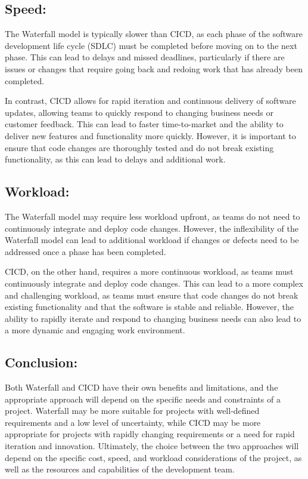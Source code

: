 \documentclass[
  10pt,
  paper=a4,
  ,captions=tableheading
]{scrartcl}
\begin{document}
\hypertarget{speed}{%
\subsection{Speed:}\label{speed}}

The Waterfall model is typically slower than CICD, as each phase of the
software development life cycle (SDLC) must be completed before moving
on to the next phase. This can lead to delays and missed deadlines,
particularly if there are issues or changes that require going back and
redoing work that has already been completed.

In contrast, CICD allows for rapid iteration and continuous delivery of
software updates, allowing teams to quickly respond to changing business
needs or customer feedback. This can lead to faster time-to-market and
the ability to deliver new features and functionality more quickly.
However, it is important to ensure that code changes are thoroughly
tested and do not break existing functionality, as this can lead to
delays and additional work.

\hypertarget{workload}{%
\subsection{Workload:}\label{workload}}

The Waterfall model may require less workload upfront, as teams do not
need to continuously integrate and deploy code changes. However, the
inflexibility of the Waterfall model can lead to additional workload if
changes or defects need to be addressed once a phase has been completed.

CICD, on the other hand, requires a more continuous workload, as teams
must continuously integrate and deploy code changes. This can lead to a
more complex and challenging workload, as teams must ensure that code
changes do not break existing functionality and that the software is
stable and reliable. However, the ability to rapidly iterate and respond
to changing business needs can also lead to a more dynamic and engaging
work environment.

\hypertarget{conclusion}{%
\subsection{Conclusion:}\label{conclusion}}

Both Waterfall and CICD have their own benefits and limitations, and the
appropriate approach will depend on the specific needs and constraints
of a project. Waterfall may be more suitable for projects with
well-defined requirements and a low level of uncertainty, while CICD may
be more appropriate for projects with rapidly changing requirements or a
need for rapid iteration and innovation. Ultimately, the choice between
the two approaches will depend on the specific cost, speed, and workload
considerations of the project, as well as the resources and capabilities
of the development team.
\end{document}
